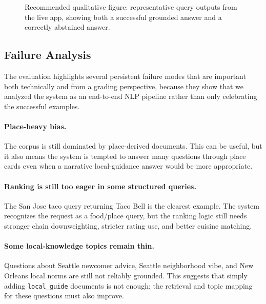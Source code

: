 \documentclass[11pt]{article}
\begin{document}
\begin{figure}[H]
\centering
{}
\caption{Recommended qualitative figure: representative query outputs from the live app, showing both a successful grounded answer and a correctly abstained answer.}
\label{fig:eval-examples}
\end{figure}

\subsection{Failure Analysis}
The evaluation highlights several persistent failure modes that are important both technically and from a grading perspective, because they show that we analyzed the system as an end-to-end NLP pipeline rather than only celebrating the successful examples.

\paragraph{Place-heavy bias.}
The corpus is still dominated by place-derived documents. This can be useful, but it also means the system is tempted to answer many questions through place cards even when a narrative local-guidance answer would be more appropriate.

\paragraph{Ranking is still too eager in some structured queries.}
The San Jose taco query returning Taco Bell is the clearest example. The system recognizes the request as a food/place query, but the ranking logic still needs stronger chain downweighting, stricter rating use, and better cuisine matching.

\paragraph{Some local-knowledge topics remain thin.}
Questions about Seattle newcomer advice, Seattle neighborhood vibe, and New Orleans local norms are still not reliably grounded. This suggests that simply adding \texttt{local\_guide} documents is not enough; the retrieval and topic mapping for these questions must also improve.
\end{document}
